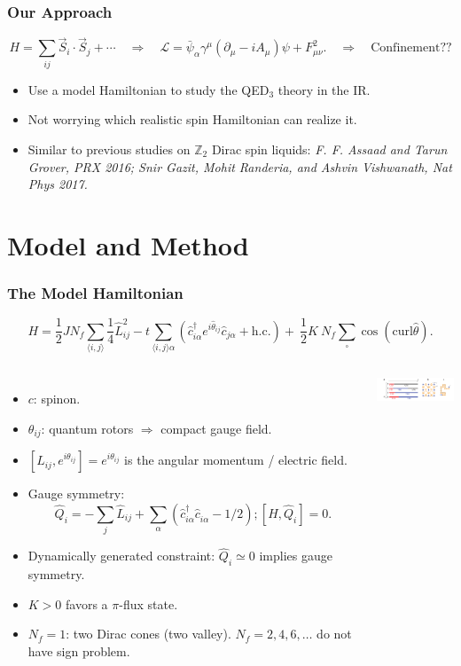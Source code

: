\documentclass[xcolor=table, 10pt, aspectratio=169]{beamer}
\begin{document}
\begin{frame}
	\frametitle{Our Approach}
	\[H = \sum_{ij}\vec S_i\cdot\vec S_j+\cdots
	\quad\Rightarrow\quad
	\mathcal L = \bar\psi_\alpha \gamma^\mu(\partial_\mu-iA_\mu)\psi
	+ F_{\mu\nu}^2.
	\quad\Rightarrow\quad\text{Confinement??}\]
	\begin{itemize}
		\item Use a model Hamiltonian to study the QED$_3$ theory in the IR.
		\item Not worrying which realistic spin Hamiltonian can realize it.
		\item Similar to previous studies on $\mathbb Z_2$ Dirac spin liquids:
		\emph{F. F. Assaad and Tarun Grover, PRX 2016; Snir Gazit, Mohit Randeria, and Ashvin Vishwanath, Nat Phys 2017.}
	\end{itemize}
\end{frame}

\section{Model and Method}

\begin{frame}
  \frametitle{The Model Hamiltonian}
  \[
  H=\frac{1}{2}JN_{f}\sum_{\langle i,j \rangle} \frac 1 4 \hat{L}^{2}_{ij}-t\sum_{\langle i,j \rangle\alpha}\left(\hat{c}^{\dagger}_{i\alpha}e^{i\hat{\theta}_{ij}}\hat{c}_{j\alpha}+\text{h.c.}\right)
  +\ \frac{1}{2}K\ N_f\sum_{\square}\cos \left( \text{curl} \hat{\theta} \right).
\]
\begin{columns}
  \begin{itemize}
    \item $c$: spinon.
    \item $\theta_{ij}$: quantum rotors $\Rightarrow$ compact gauge field.
    \item $[L_{ij}, e^{i\theta_{ij}}]=e^{i\theta_{ij}}$ is the angular momentum / electric field.
    \item Gauge symmetry:
    \[\hat{Q}_{i} = -\sum_{j}\hat{L}_{ij} + \sum_{\alpha} \left( \hat{c}^{\dagger}_{i\alpha}\hat{c}^{\phantom\dagger}_{i\alpha} - 1/2 \right);[H, \hat Q_i] = 0.\]
    \item Dynamically generated constraint:
		$\hat Q_i \simeq 0$ implies gauge symmetry.
    \item $K>0$ favors a $\pi$-flux state.
		\item $N_f=1$: two Dirac cones (two valley). $N_f=2,4,6,\ldots$ do not have sign problem.
  \end{itemize}

  \begin{center}
    \includegraphics[width=3cm]{model}
  \end{center}
\end{columns}
\end{frame}
\end{document}
